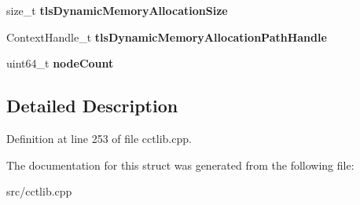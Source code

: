 \begin{DoxyCompactItemize}
\item 
\hypertarget{structPinCCTLib_1_1ThreadData_a3178b3319a1e93159dad6420af19ffb8}{size\-\_\-t {\bfseries tls\-Dynamic\-Memory\-Allocation\-Size}}\label{structPinCCTLib_1_1ThreadData_a3178b3319a1e93159dad6420af19ffb8}

\item 
\hypertarget{structPinCCTLib_1_1ThreadData_a47de3d50ff974aeff23ef32f630a6b14}{Context\-Handle\-\_\-t {\bfseries tls\-Dynamic\-Memory\-Allocation\-Path\-Handle}}\label{structPinCCTLib_1_1ThreadData_a47de3d50ff974aeff23ef32f630a6b14}

\item 
\hypertarget{structPinCCTLib_1_1ThreadData_a58a478aa0e7912bc15a180d62d28397d}{uint64\-\_\-t {\bfseries node\-Count}}\label{structPinCCTLib_1_1ThreadData_a58a478aa0e7912bc15a180d62d28397d}

\end{DoxyCompactItemize}


\subsection{Detailed Description}


Definition at line 253 of file cctlib.\-cpp.



The documentation for this struct was generated from the following file\-:\begin{DoxyCompactItemize}
\item 
src/cctlib.\-cpp\end{DoxyCompactItemize}
